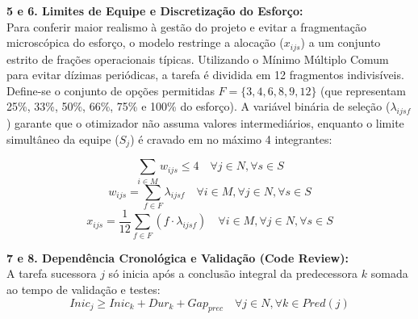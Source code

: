 \documentclass[a4paper,11pt]{article}
\begin{document}
\vspace{0.2cm}
\noindent\textbf{5 e 6. Limites de Equipe e Discretização do Esforço:} \\
Para conferir maior realismo à gestão do projeto e evitar a fragmentação microscópica do esforço, o modelo restringe a alocação ($x_{ijs}$) a um conjunto estrito de frações operacionais típicas. Utilizando o Mínimo Múltiplo Comum para evitar dízimas periódicas, a tarefa é dividida em 12 fragmentos indivisíveis. Define-se o conjunto de opções permitidas $F = \{3, 4, 6, 8, 9, 12\}$ (que representam 25\%, 33\%, 50\%, 66\%, 75\% e 100\% do esforço). A variável binária de seleção ($\lambda_{ijsf}$) garante que o otimizador não assuma valores intermediários, enquanto o limite simultâneo da equipe ($S_j$) é cravado em no máximo 4 integrantes:

\begin{equation}
    \sum_{i \in M} w_{ijs} \le 4 \quad \forall j \in N, \forall s \in S
\end{equation}
\begin{equation}
    w_{ijs} = \sum_{f \in F} \lambda_{ijsf} \quad \forall i \in M, \forall j \in N, \forall s \in S
\end{equation}
\begin{equation}
    x_{ijs} = \frac{1}{12} \sum_{f \in F} \left( f \cdot \lambda_{ijsf} \right) \quad \forall i \in M, \forall j \in N, \forall s \in S
\end{equation}

\vspace{0.2cm}
\noindent\textbf{7 e 8. Dependência Cronológica e Validação (Code Review):} \\
A tarefa sucessora $j$ só inicia após a conclusão integral da predecessora $k$ 
somada ao tempo de validação e testes:
\begin{equation}
    Inic_{j} \ge Inic_{k} + Dur_{k} + Gap_{prec} \quad \forall j \in N, \forall k \in Pred(j)
\end{equation}
\end{document}
